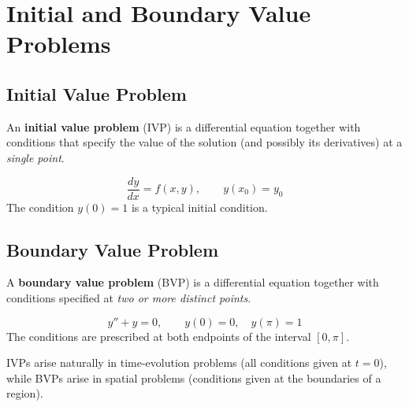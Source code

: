 \chapter{Initial and Boundary Value Problems}

\section{Initial Value Problem}

\begin{definition}
An \textbf{initial value problem} (IVP) is a differential equation together with conditions that specify the value of the solution (and possibly its derivatives) at a \emph{single point}.
\end{definition}

\begin{example}
\[
  \frac{dy}{dx} = f(x,y), \qquad y(x_0) = y_0
\]
The condition $y(0) = 1$ is a typical initial condition.
\end{example}

\section{Boundary Value Problem}

\begin{definition}
A \textbf{boundary value problem} (BVP) is a differential equation together with conditions specified at \emph{two or more distinct points}.
\end{definition}

\begin{example}
\[
  y'' + y = 0, \qquad y(0) = 0,\quad y(\pi) = 1
\]
The conditions are prescribed at both endpoints of the interval $[0,\pi]$.
\end{example}

\begin{remark}
IVPs arise naturally in time-evolution problems (all conditions given at $t = 0$), while BVPs arise in spatial problems (conditions given at the boundaries of a region).
\end{remark}
